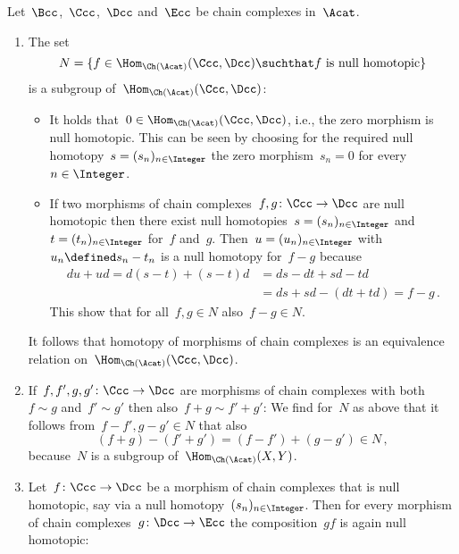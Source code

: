 \begin{remarkdefinition}
  \label{definition of homotopy category}
  Let~$\Bcc$,~$\Ccc$,~$\Dcc$ and~$\Ecc$ be chain complexes in~$\Acat$.
  \begin{enumerate}
    \item
      The set
      \[
          N
        = \{
            f \in \Hom_{\Ch(\Acat)}(\Ccc, \Dcc)
          \suchthat
            \text{$f$ is null homotopic}
          \}
      \]
      is a subgroup of~$\Hom_{\Ch(\Acat)}(\Ccc, \Dcc)$:
      \begin{itemize}
        \item
          It holds that~$0 \in \Hom_{\Ch(\Acat)}(\Ccc, \Dcc)$, i.e., the zero morphism is null homotopic.
          This can be seen by choosing for the required null homotopy~$s = (s_n)_{n \in \Integer}$ the zero morphism~$s_n = 0$ for every~$n \in \Integer$.
        \item
          If two morphisms of chain complexes~$f, g \colon \Ccc \to \Dcc$ are null homotopic then there exist null homotopies~$s = (s_n)_{n \in \Integer}$ and~$t = (t_n)_{n \in \Integer}$ for~$f$ and~$g$.
          Then~$u = (u_n)_{n \in \Integer}$ with~$u_n \defined s_n - t_n$ is a null homotopy for~$f - g$ because
          \begin{align*}
                du + ud
             =  d(s - t) + (s - t)d
            &=  ds - dt + sd - td \\
            &=  ds + sd - (dt + td)
             =  f - g \,.
          \end{align*}
          This show that for all~$f, g \in N$ also~$f - g \in N$.
      \end{itemize}
      It follows that homotopy of morphisms of chain complexes is an equivalence relation on~$\Hom_{\Ch(\Acat)}(\Ccc, \Dcc)$.
    \item
      \label{welldefinedness of sum}
      If~$f, f', g, g' \colon \Ccc \to \Dcc$ are morphisms of chain complexes with both~$f \sim g$ and~$f' \sim g'$ then also~$f + g \sim f' + g'$:
      We find for~$N$ as above that it follows from~$f - f', g - g' \in N$ that also
      \[
            (f + g) - (f' + g')
        =   (f - f') + (g - g')
        \in N \,,
      \]
      because~$N$ is a subgroup of~$\Hom_{\Ch(\Acat)}(X,Y)$.
    \item
      Let~$f \colon \Ccc \to \Dcc$ be a morphism of chain complexes that is null homotopic, say via a null homotopy~$(s_n)_{n \in \Integer}$.
      Then for every morphism of chain complexes~$g \colon \Dcc \to \Ecc$ the composition~$gf$ is again null homotopic:

\end{enumerate}
\end{remarkdefinition}
